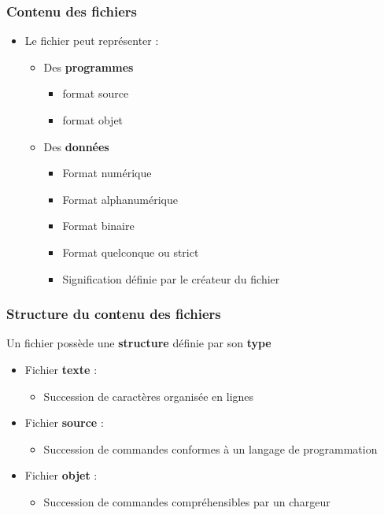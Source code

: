 \begin{frame}
\frametitle{Contenu des fichiers}
\begin{itemize}
\item Le fichier peut représenter :
\begin{itemize}
\item Des \textbf{programmes}
\begin{itemize}
\item format source
\item format objet
\end{itemize}
\item Des \textbf{données}
\begin{itemize}
\item Format numérique
\item Format alphanumérique
\item Format binaire
\item Format quelconque ou strict
\item Signification définie par le créateur du fichier
\end{itemize}
\end{itemize}
\end{itemize}
\end{frame}


\begin{frame}
\frametitle{Structure du contenu des fichiers}
Un fichier possède une \textbf{structure} définie par son \textbf{type}
\begin{itemize}
\item Fichier \textbf{texte} :
\begin{itemize}
\item Succession de caractères organisée en lignes
\end{itemize}
\item Fichier \textbf{source} :
\begin{itemize}
\item Succession de commandes conformes à un langage de programmation
\end{itemize}
\item Fichier \textbf{objet} :
\begin{itemize}
\item Succession de commandes compréhensibles par un chargeur
\end{itemize}
\end{itemize}
\end{frame}


